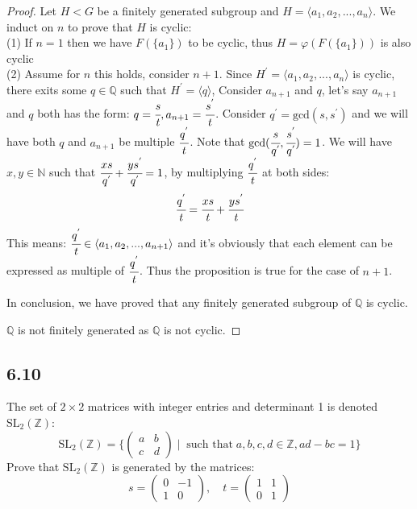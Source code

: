 \documentclass[a4paper, pdf, 12pt]{article}
\begin{document}
\begin{proof}
  Let $H<G$ be a finitely generated subgroup and $H=\langle a_1,a_2,...,a_n\rangle$. We induct on $n$ to
  prove that $H$ is cyclic: \\
  \noindent
  (1) If $n=1$ then we have $F(\{a_1\})$ to be cyclic, thus $H=\varphi(F(\{a_1\}))$ is also cyclic\\
  (2) Assume for $n$ this holds, consider $n+1$. Since $H^{'}=\langle a_1,a_2,...,a_n\rangle$ is cyclic, there
  exits some $q\in \mathbb{Q}$ such that $H^{'} = \langle q\rangle$, Consider $a_{n+1}$ and $q$, let's say $a_{n+1}$
  and $q$ both has the form: $q=\cfrac{s}{t}, a_{n+1}=\cfrac{s^{'}}{t}$. Consider $q^{'} = \mbox{gcd}(s, s^{'})$ and we will
  have both $q$ and $a_{n+1}$ be multiple $\cfrac{q^{'}}{t}$. Note that $\mbox{gcd}(\cfrac{s}{q^{'}}, \cfrac{s^{'}}{q^{'}}) = 1$.
  We will have $x, y\in \mathbb{N}$ such that $\cfrac{xs}{q^{'}} + \cfrac{ys^{'}}{q^{'}} = 1$, by multiplying $\cfrac{q^{'}}{t}$ at both sides:
  $$
    \cfrac{q^{'}}{t} = \cfrac{xs}{t} + \cfrac{ys^{'}}{t}
  $$
  This means: $\cfrac{q^{'}}{t}\in \langle a_1, a_2,..., a_{n+1} \rangle$ and it's obviously that each element can be
  expressed as multiple of $\cfrac{q^{'}}{t}$. Thus the proposition is true for the case of $n+1$.

  In conclusion, we have proved that any finitely generated subgroup of $\mathbb{Q}$ is cyclic.

  $\mathbb{Q}$ is not finitely generated as $\mathbb{Q}$ is not cyclic.
\end{proof}

\subsection*{6.10}
The set of $2\times2$ matrices with integer entries and determinant 1 is denoted
$\mbox{SL}_2(\mathbb{Z})$:
$$
  \mbox{SL}_2(\mathbb{Z}) = \bigg\{
  \begin{pmatrix}
    a & b \\
    c & d
  \end{pmatrix}
  \mid
  \;
  \mbox{such that}\;a, b, c, d\in \mathbb{Z},ad-bc=1
  \bigg\}
$$
Prove that $\mbox{SL}_{2}(\mathbb{Z})$ is generated by the matrices:
$$
  s = \begin{pmatrix}
    0 & -1 \\
    1 & 0
  \end{pmatrix}
  ,
  \quad
  t = \begin{pmatrix}
    1 & 1 \\
    0 & 1
  \end{pmatrix}
$$
\end{document}
